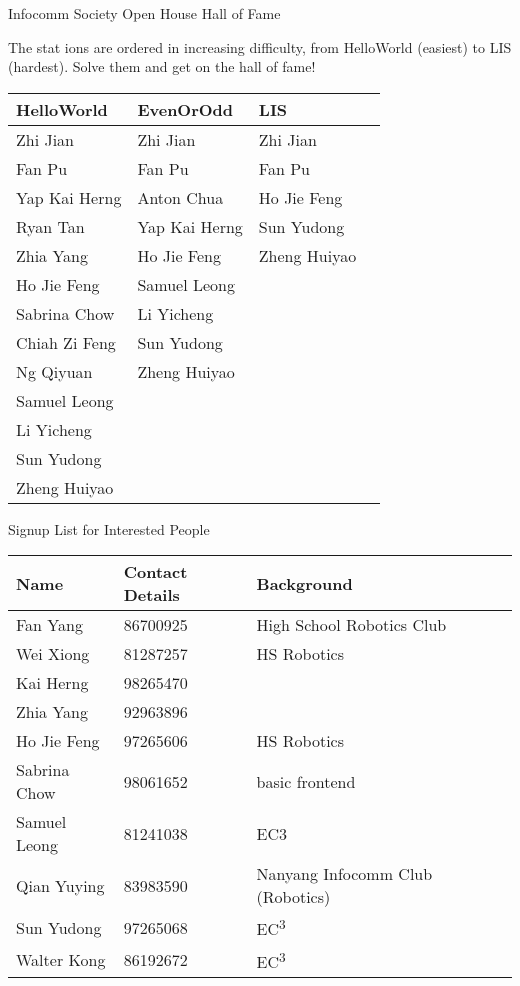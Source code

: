 \documentclass[30pt,letter]{report}
\begin{document}
\begin{center}
{\Huge Infocomm Society Open House Hall of Fame}
\end{center}

{\LARGE
The stat	ions are ordered in increasing difficulty, from HelloWorld (easiest) to LIS (hardest). Solve them and get on the hall of fame!
}

{\Large
\begin{center}
    \begin{tabular}{| l | l | l | l |}
    \hline
    HelloWorld & EvenOrOdd & LIS\\ \hline
    Zhi Jian & Zhi Jian & Zhi Jian \\ \hline
    Fan Pu & Fan Pu & Fan Pu \\ \hline
    Yap Kai Herng & Anton Chua & Ho Jie Feng \\ \hline
    Ryan Tan & Yap Kai Herng & Sun Yudong\\ \hline 
	Zhia Yang & Ho Jie Feng & Zheng Huiyao \\ \hline
    Ho Jie Feng & Samuel Leong & \\ \hline
    Sabrina Chow & Li Yicheng & \\ \hline
    Chiah Zi Feng & Sun Yudong & \\ \hline
    Ng Qiyuan & Zheng Huiyao & \\ \hline
    Samuel Leong & & \\ \hline
    Li Yicheng & & \\ \hline
    Sun Yudong & & \\ \hline
	Zheng Huiyao & & \\ \hline    
    \end{tabular}
    \newpage
    Signup List for Interested People\\
\end{center}

    \begin{tabular}{| l | l | l | l |}
    \hline
    Name & Contact Details & Background \\ \hline
   Fan Yang & 86700925 & High School Robotics Club \\ \hline
   Wei Xiong & 81287257 & HS Robotics \\ \hline
   Kai Herng & 98265470 & \\ \hline
   Zhia Yang & 92963896 & \\ \hline
   Ho Jie Feng & 97265606 & HS Robotics \\ \hline
   Sabrina Chow & 98061652 & basic frontend \\ \hline
   Samuel Leong & 81241038 & EC3 \\ \hline
    Qian Yuying & 83983590 & Nanyang Infocomm Club (Robotics) \\ \hline
    Sun Yudong & 97265068 & EC\textsuperscript{3} \\ \hline
   Walter Kong & 86192672 & EC\textsuperscript{3} \\ \hline
    
    \end{tabular}

}
\end{document}
